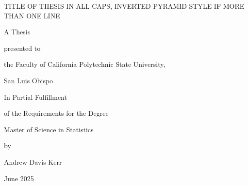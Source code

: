 \begin{center}
\thispagestyle{empty}

TITLE OF THESIS IN ALL CAPS, INVERTED PYRAMID STYLE IF MORE THAN ONE LINE

\vspace{1in}

A Thesis 

\vspace{.25in}

presented to 

\vspace{.25in}

the Faculty of California Polytechnic State University, 

\vspace{.25in}

San Luis Obispo

\vspace{1in}

In Partial Fulfillment 

\vspace{.25in}

of the Requirements for the Degree 

\vspace{.25in}

Master of Science in Statistics 

\vspace{1in}

by 

\vspace{.25in}

Andrew Davis Kerr

\vspace{.25in}

June 2025

\end{center}
\clearpage